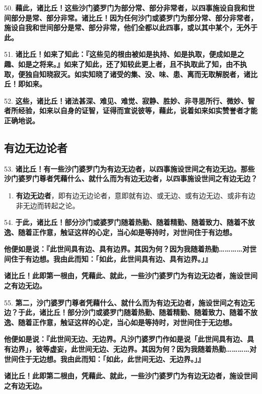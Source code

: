 {\Large 50.} \textbf{藉此，诸比丘！这些沙门婆罗门为部分常、部分非常者，以四事施设自我和世间部分是常、部分非常。诸比丘！因为任何沙门或婆罗门为部分常、部分非常者，施设自我和世间部分是常、部分非常，他们全都以此四事，或以其中某个，无外于此。}

{\Large 51.} \textbf{诸比丘！如来了知此：『这些见的根由被如是执持、如是执取，便成如是之趣、如是之将来。』如来了知此，还了知较此更上者，且不执取此了知，由不执取，便独自知晓寂灭。如实知晓了诸受的集、没、味、患、离而无取解脱者，诸比丘！即如来。}

{\Large 52.} \textbf{这些，诸比丘！诸法甚深、难见、难觉、寂静、胜妙、非寻思所行、微妙、智者所经验，如来以自身的证智，证得而宣说彼等，藉此，说着如来如实赞誉者才能正确地说。}

\subsection{有边无边论者}

{\Large 53.} \textbf{诸比丘！有一些沙门婆罗门为有边无边者，以四事施设世间之有边无边。那些沙门婆罗门尊者凭藉什么、就什么而为有边无边者，以四事施设世间之有边无边？}

\begin{enumerate}\item \textbf{有边无边者}，即有边无边论者，意即就有边、或无边、或有边无边、或非有边非无边而转起之论。\end{enumerate}

{\Large 54.} \textbf{于此，诸比丘！部分沙门或婆罗门随着热勤、随着精勤、随着致力、随着不放逸、随着正作意，触证这样的心定，当心如是等持时，对世间住于有边想。}

\textbf{他便如是说：『此世间具有边、具有边界。其因为何？因为我随着热勤…………对世间住于有边想。我由此而知：「如此，此世间具有边、具有边界。」』}

\textbf{诸比丘！此即第一根由，凭藉此、就此，一些沙门婆罗门为有边无边者，施设世间之有边无边。}

{\Large 55.} \textbf{第二，沙门婆罗门尊者凭藉什么、就什么而为有边无边者，施设世间之有边无边？于此，诸比丘！部分沙门或婆罗门随着热勤、随着精勤、随着致力、随着不放逸、随着正作意，触证这样的心定，当心如是等持时，对世间住于无边想。}

\textbf{他便如是说：『此世间无边、无边界。凡沙门婆罗门作如是说「此世间具有边、具有边界」，彼等虚妄，此世间无边、无边界。其因为何？因为我随着热勤…………对世间住于无边想。我由此而知：「如此，此世间无边、无边界。」』}

\textbf{诸比丘！此即第二根由，凭藉此、就此，一些沙门婆罗门为有边无边者，施设世间之有边无边。}

